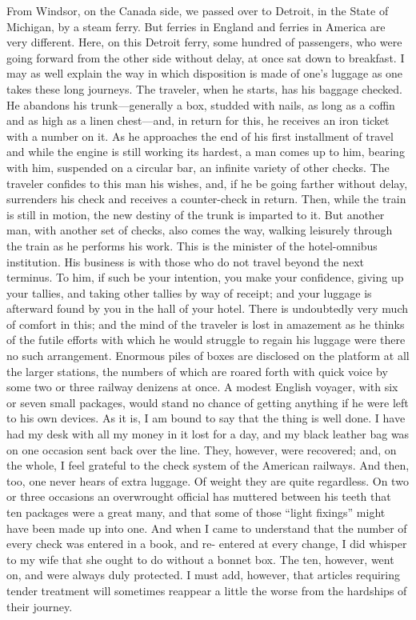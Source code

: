 From Windsor, on the Canada side, we passed over to Detroit, in the
State of Michigan, by a steam ferry.  But ferries in England and
ferries in America are very different.  Here, on this Detroit
ferry, some hundred of passengers, who were going forward from the
other side without delay, at once sat down to breakfast.  I may as
well explain the way in which disposition is made of one's luggage
as one takes these long journeys.  The traveler, when he starts,
has his baggage checked.  He abandons his trunk---generally a box,
studded with nails, as long as a coffin and as high as a linen
chest---and, in return for this, he receives an iron ticket with a
number on it.  As he approaches the end of his first installment of
travel and while the engine is still working its hardest, a man
comes up to him, bearing with him, suspended on a circular bar, an
infinite variety of other checks.  The traveler confides to this
man his wishes, and, if he be going farther without delay,
surrenders his check and receives a counter-check in return.  Then,
while the train is still in motion, the new destiny of the trunk is
imparted to it.  But another man, with another set of checks, also
comes the way, walking leisurely through the train as he performs
his work.  This is the minister of the hotel-omnibus institution.
His business is with those who do not travel beyond the next
terminus.  To him, if such be your intention, you make your
confidence, giving up your tallies, and taking other tallies by way
of receipt; and your luggage is afterward found by you in the hall
of your hotel.  There is undoubtedly very much of comfort in this;
and the mind of the traveler is lost in amazement as he thinks of
the futile efforts with which he would struggle to regain his
luggage were there no such arrangement.  Enormous piles of boxes
are disclosed on the platform at all the larger stations, the
numbers of which are roared forth with quick voice by some two or
three railway denizens at once.  A modest English voyager, with six
or seven small packages, would stand no chance of getting anything
if he were left to his own devices.  As it is, I am bound to say
that the thing is well done.  I have had my desk with all my money
in it lost for a day, and my black leather bag was on one occasion
sent back over the line.  They, however, were recovered; and, on
the whole, I feel grateful to the check system of the American
railways.  And then, too, one never hears of extra luggage.  Of
weight they are quite regardless.  On two or three occasions an
overwrought official has muttered between his teeth that ten
packages were a great many, and that some of those ``light fixings''
might have been made up into one.  And when I came to understand
that the number of every check was entered in a book, and re-
entered at every change, I did whisper to my wife that she ought to
do without a bonnet box.  The ten, however, went on, and were
always duly protected.  I must add, however, that articles
requiring tender treatment will sometimes reappear a little the
worse from the hardships of their journey.

